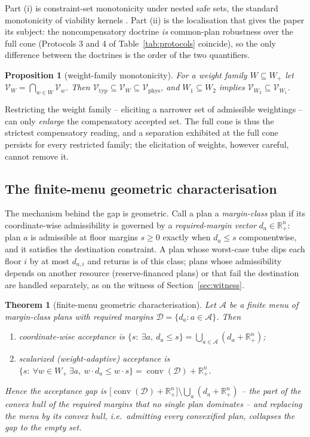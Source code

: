 \documentclass[preprint,11pt,authoryear]{elsarticle}
\newtheorem{theorem}{Theorem}
\newtheorem{proposition}{Proposition}
\theoremstyle{definition}
\theoremstyle{remark}
\newcommand{\Vtyp}{\mathcal{V}_{\mathrm{typ}}}
\newcommand{\Vphys}{\mathcal{V}_{\mathrm{phys}}}
\newcommand{\Wp}{W_+}
\newcommand{\conv}{\operatorname{conv}}
\newcommand{\Rp}{\mathbb{R}^n_+}
\begin{document}
Part (i) is constraint-set monotonicity under nested safe sets, the standard monotonicity of viability kernels \citep{Aubin1991,Frankowska1989}. Part (ii) is the localisation that gives the paper its subject: the noncompensatory doctrine \emph{is} common-plan robustness over the full cone (Protocols 3 and 4 of Table~\ref{tab:protocols} coincide), so the only difference between the doctrines is the order of the two quantifiers.

\begin{proposition}[weight-family monotonicity]\label{prop:monotone}
For a weight family $W\subseteq\Wp$ let $\mathcal V_W=\bigcap_{w\in W}\mathcal V_w$. Then $\Vtyp\subseteq\mathcal V_W\subseteq\Vphys$, and $W_1\subseteq W_2$ implies $\mathcal V_{W_2}\subseteq\mathcal V_{W_1}$.
\end{proposition}

Restricting the weight family -- eliciting a narrower set of admissible weightings -- can only \emph{enlarge} the compensatory accepted set. The full cone is thus the strictest compensatory reading, and a separation exhibited at the full cone persists for every restricted family; the elicitation of weights, however careful, cannot remove it.

\subsection{The finite-menu geometric characterisation}

The mechanism behind the gap is geometric. Call a plan a \emph{margin-class} plan if its coordinate-wise admissibility is governed by a \emph{required-margin vector} $d_a\in\Rp$: plan $a$ is admissible at floor margins $s\ge0$ exactly when $d_a\le s$ componentwise, and it satisfies the destination constraint. A plan whose worst-case tube dips each floor $i$ by at most $d_{a,i}$ and returns is of this class; plans whose admissibility depends on another resource (reserve-financed plans) or that fail the destination are handled separately, as on the witness of Section~\ref{sec:witness}.

\begin{theorem}[finite-menu geometric characterisation]\label{thm:menu}
Let $\mathcal A$ be a finite menu of margin-class plans with required margins $\mathcal D=\{d_a:a\in\mathcal A\}$. Then
\begin{enumerate}[label=\textup{(\roman*)},leftmargin=2em]
\item coordinate-wise acceptance is $\{s:\ \exists a,\ d_a\le s\}=\bigcup_{a\in\mathcal A}(d_a+\Rp)$;
\item scalarized (weight-adaptive) acceptance is $\{s:\ \forall w\in\Wp\ \exists a,\ w\cdot d_a\le w\cdot s\}=\conv(\mathcal D)+\Rp$.
\end{enumerate}
Hence the acceptance gap is $\big[\conv(\mathcal D)+\Rp\big]\setminus\bigcup_{a}(d_a+\Rp)$ -- the part of the convex hull of the required margins that no single plan dominates -- and replacing the menu by its convex hull, i.e.\ admitting every convexified plan, collapses the gap to the empty set.
\end{theorem}
\end{document}
